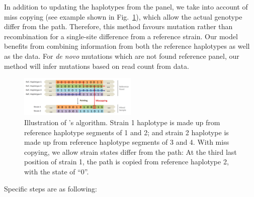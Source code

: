 \documentclass{bioinfo}
\begin{document}
In addition to updating the haplotypes from the panel, we take into account of miss copying (see example shown in Fig.~\ref{fig:ls}), which allow the actual genotype differ from the path. Therefore, this method favours mutation rather than recombination for a single-site difference from a reference strain. Our model benefits from combining information from both the reference haplotypes as well as the data. For {\em de novo} mutations which are not found reference panel, our method will infer mutations based on read count from data.
\begin{figure}[tbh]
\centering
\includegraphics[width=0.5\textwidth]{coupled-painting.png}
\caption{Illustration of \citet{Li2003}'s algorithm. Strain 1 haplotype is made up from reference haplotype segments of 1 and 2; and strain 2 haplotype is made up from reference haplotype segments of 3 and 4. With miss copying, we allow strain states differ from the path: At the third last position of strain 1, the path is copied from reference haplotype 2, with the state of ``0''.
}\label{fig:ls}
\end{figure}
Specific steps are as following:
\end{document}
